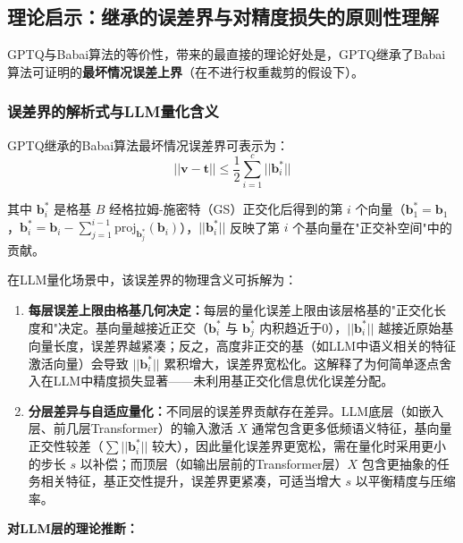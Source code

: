 \documentclass[letterpaper,twocolumn,10pt]{article}
\begin{document}
\subsection{理论启示：继承的误差界与对精度损失的原则性理解}

GPTQ与Babai算法的等价性，带来的最直接的理论好处是，GPTQ继承了Babai算法可证明的\textbf{最坏情况误差上界}（在不进行权重裁剪的假设下）。

\subsubsection{误差界的解析式与LLM量化含义}

GPTQ继承的Babai算法最坏情况误差界可表示为：
$$||\mathbf{v} - \mathbf{t}|| \leq \frac{1}{2}\sum_{i=1}^c ||\mathbf{b}_i^*||$$

其中 $\mathbf{b}_i^*$ 是格基 $B$ 经格拉姆-施密特（GS）正交化后得到的第 $i$ 个向量（$\mathbf{b}_1^* = \mathbf{b}_1$，$\mathbf{b}_i^* = \mathbf{b}_i - \sum_{j=1}^{i-1} \text{proj}_{\mathbf{b}_j^*}(\mathbf{b}_i)$），$||\mathbf{b}_i^*||$ 反映了第 $i$ 个基向量在"正交补空间"中的贡献。

在LLM量化场景中，该误差界的物理含义可拆解为：

\begin{enumerate}
\item \textbf{每层误差上限由格基几何决定：}每层的量化误差上限由该层格基的"正交化长度和"决定。基向量越接近正交（$\mathbf{b}_i^*$ 与 $\mathbf{b}_j^*$ 内积趋近于0），$||\mathbf{b}_i^*||$ 越接近原始基向量长度，误差界越紧凑；反之，高度非正交的基（如LLM中语义相关的特征激活向量）会导致 $||\mathbf{b}_i^*||$ 累积增大，误差界宽松化。这解释了为何简单逐点舍入在LLM中精度损失显著——未利用基正交化信息优化误差分配。

\item \textbf{分层差异与自适应量化：}不同层的误差界贡献存在差异。LLM底层（如嵌入层、前几层Transformer）的输入激活 $X$ 通常包含更多低频语义特征，基向量正交性较差（$\sum ||\mathbf{b}_i^*||$ 较大），因此量化误差界更宽松，需在量化时采用更小的步长 $s$ 以补偿；而顶层（如输出层前的Transformer层）$X$ 包含更抽象的任务相关特征，基正交性提升，误差界更紧凑，可适当增大 $s$ 以平衡精度与压缩率。
\end{enumerate}

\textbf{对LLM层的理论推断：}
\end{document}
